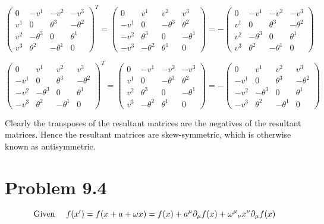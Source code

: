 \documentclass{article}
\begin{document}
\[\begin{pmatrix}0&-v^1&-v^2&-v^3\\v^1&0&\theta^3&-\theta^2\\v^2&-\theta^3&0&\theta^1\\v^3&\theta^2&-\theta^1&0\end{pmatrix}^T=\begin{pmatrix}0&v^1&v^2&v^3\\-v^1&0&-\theta^3&\theta^2\\-v^2&\theta^3&0&-\theta^1\\-v^3&-\theta^2&\theta^1&0\end{pmatrix}=-\begin{pmatrix}0&-v^1&-v^2&-v^3\\v^1&0&\theta^3&-\theta^2\\v^2&-\theta^3&0&\theta^1\\v^3&\theta^2&-\theta^1&0\end{pmatrix}\]

\[\begin{pmatrix}0&v^1&v^2&v^3\\-v^1&0&\theta^3&-\theta^2\\-v^2&-\theta^3&0&\theta^1\\-v^3&\theta^2&-\theta^1&0\end{pmatrix}^T=\begin{pmatrix}0&-v^1&-v^2&-v^3\\v^1&0&-\theta^3&\theta^2\\v^2&\theta^3&0&-\theta^1\\v^3&-\theta^2&\theta^1&0\end{pmatrix}=-\begin{pmatrix}0&v^1&v^2&v^3\\-v^1&0&\theta^3&-\theta^2\\-v^2&-\theta^3&0&\theta^1\\-v^3&\theta^2&-\theta^1&0\end{pmatrix}\]

Clearly the transposes of the resultant matrices are the negatives of the resultant matrices. Hence the resultant matrices are skew-symmetric, which is otherwise known as antisymmetric.


 
\section*{Problem 9.4}

\[\qq*{Given } f(x^\prime) = f(x+a+\omega x) = f(x)+a^\mu \partial_\mu f(x)+{\omega^\mu}_\nu x^\nu \partial_\mu f(x)\]
\end{document}
